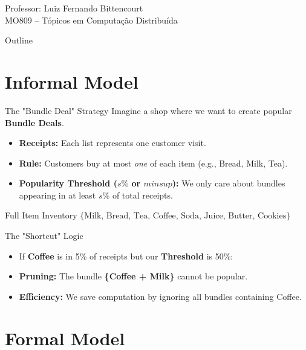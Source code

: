 \documentclass[xcolor={dvipsnames}]{beamer}
\title[\MyShortTitle]{\MyTitle}
\author[\MyShortAuthor]{\MyAuthor}
\institute{\MyInstitute}
\date{\MyDate}
\begin{document}
\begin{frame}[plain]
  \titlepage
  \begin{center}
      \footnotesize Professor: Luiz Fernando Bittencourt \\
      MO809 -- Tópicos em Computação Distribuída
  \end{center}
\end{frame}

\begin{frame}{Outline}
  \tableofcontents
\end{frame}

\section{Informal Model}

\begin{frame}{The "Bundle Deal" Strategy}
    Imagine a shop where we want to create popular \textbf{Bundle Deals}.
    \vfill
    \begin{itemize}
        \item \textbf{Receipts:} Each list represents one customer visit.
        \item \textbf{Rule:} Customers buy at most \textit{one} of each item (e.g., Bread, Milk, Tea).
        \item \textbf{Popularity Threshold ($s\%$ or $minsup$):} We only care about bundles appearing in at least $s\%$ of total receipts.
    \end{itemize}
    \vfill
    \begin{block}{Full Item Inventory}
        $\{\text{Milk, Bread, Tea, Coffee, Soda, Juice, Butter, Cookies}\}$
    \end{block}
\end{frame}

\begin{frame}{The "Shortcut" Logic}
    \begin{itemize}
        \item If \textbf{Coffee} is in 5\% of receipts but our \textbf{Threshold} is 50\%:
        \item \textbf{Pruning:} The bundle \textbf{\{Coffee + Milk\}} cannot be popular.
        \item \textbf{Efficiency:} We save computation by ignoring all bundles containing Coffee.
    \end{itemize}
    \vfill
\end{frame}

\section{Formal Model}
\end{document}
